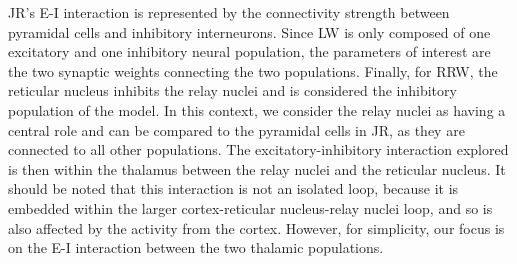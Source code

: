 \documentclass[12pt,twoside]{article}
\begin{document}
JR's E-I interaction is represented by the connectivity strength between pyramidal cells and inhibitory interneurons. Since LW is only composed of one excitatory and one inhibitory neural population, the parameters of interest are the two synaptic weights connecting the two populations. Finally, for RRW, the reticular nucleus inhibits the relay nuclei and is considered the inhibitory population of the model. In this context, we consider the relay nuclei as having a central role and can be compared to the pyramidal cells in JR, as they are connected to all other populations. The excitatory-inhibitory interaction explored is then within the thalamus between the relay nuclei and the reticular nucleus. It should be noted that this interaction is not an isolated loop, because it is embedded within the larger cortex-reticular nucleus-relay nuclei loop, and so is also affected by the activity from the cortex. However, for simplicity, our focus is on the E-I interaction between the two thalamic populations.


\end{document}

